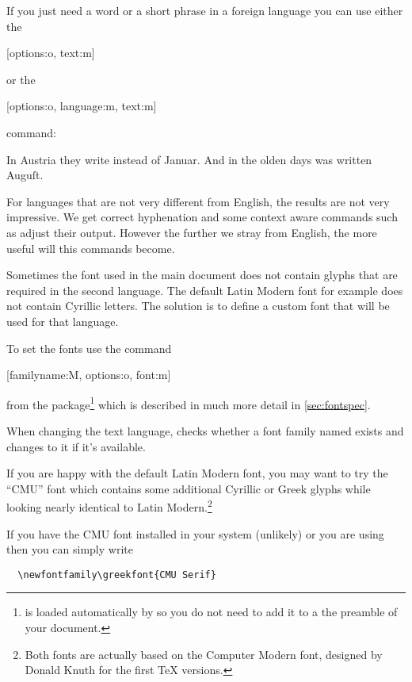 If you just need a word or a short phrase in a foreign language you can use
either the
\begin{lscommand}
  [options:o, text:m]
\end{lscommand}
or the
\begin{lscommand}
  [options:o, language:m, text:m]
\end{lscommand}
command:
\begin{example}[examplewidth=0.8\linewidth, vertical_mode]
In Austria they write
instead of \textgerman{Januar}. And in the olden
days  was written
\textgerman[script=blackletter]{Auguſt}.
\end{example}

For languages that are not very different from English, the results are not
very impressive. We get correct hyphenation and some context aware commands
such as  adjust their output. However the further we stray from
English, the more useful will this commands become.

Sometimes the font used in the main document does not contain glyphs that are
required in the second language. The default Latin Modern font for example does not
contain Cyrillic letters. The solution is to define a custom font that will be used
for that language.

To set the fonts use the command
\begin{lscommand}
  [familyname:M, options:o, font:m]
\end{lscommand}
from the  package\footnote{ is loaded automatically
  by  so you do not need to add it to a the preamble of your
  document.} which is described in much more detail in
\autoref{sec:fontspec}.

When changing the text language,  checks whether a font family named
 exists and changes to it if it's available.

If you are happy with the default Latin Modern font, you may want to try the \enquote{CMU} font
which contains some additional Cyrillic or Greek glyphs
while looking nearly identical to Latin Modern.\footnote{Both fonts are
  actually based on the Computer Modern font, designed by Donald Knuth for
  the first \TeX{} versions.}

If you have the CMU font installed in your system (unlikely) or you are using
 then you can simply write
\begin{verbatim}
  \newfontfamily\greekfont{CMU Serif}
\end{verbatim}


